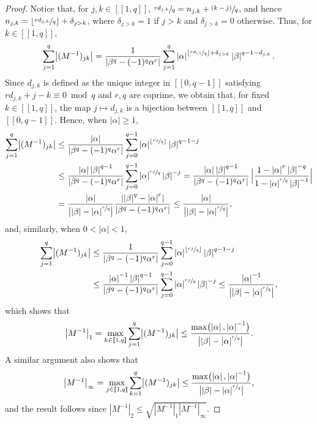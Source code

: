 \documentclass[10pt]{article}
\newcommand{\psfrac}[2]{\sfrac{(#1)}{#2}}
\newcommand{\llbracket}{[\![}
\newcommand{\rrbracket}{]\!]}
\theoremstyle{plain}
\theoremstyle{definition}
\newcommand{\abs}[1]{\left\lvert #1\right \rvert}
\newcommand{\floor}[1]{\left\lfloor #1 \right\rfloor}
\newcommand{\babs}[1]{\bigl\lvert #1\bigr \rvert}
\newcommand{\Babs}[1]{\Bigl\lvert #1\Bigr \rvert}
\numberwithin{equation}{section}\numberwithin{figure}{section}\emergencystretch=3em
\begin{document}
\begin{proof}
Notice that, for $j, k \in \llbracket 1, q\rrbracket$, $\sfrac{r d_{j, k}}{q} = n_{j, k} + \psfrac{k-j}{q}$, and hence $n_{j, k} = \floor{\sfrac{r d_{j, k}}{q}} + \delta_{j > k}$, where $\delta_{j > k} = 1$ if $j > k$ and $\delta_{j > k} = 0$ otherwise. Thus, for $k \in \llbracket 1, q\rrbracket$,\vspace*{-3pt}
\[
\sum_{j=1}^q \babs{(M^{-1})_{jk}} = \frac{1}{\abs{\beta^q - (-1)^q \alpha^r}} \sum_{j=1}^q \abs{\alpha}^{\floor{\sfrac{r d_{j, k}}{q}} + \delta_{j > k}} \abs{\beta}^{q-1-d_{j, k}}.
\]
Since $d_{j, k}$ is defined as the unique integer in $\llbracket 0, q-1\rrbracket$ satisfying $r d_{j, k} + j - k \equiv 0 \bmod q$ and $r, q$ are coprime, we obtain that, for fixed $k \in \llbracket 1, q\rrbracket$, the map $j \mapsto d_{j, k}$ is a bijection between $\llbracket 1, q\rrbracket$ and $\llbracket 0, q-1\rrbracket$. Hence, when $\abs{\alpha} \geq 1$,\vspace*{-3pt}
\begin{align*}
\sum_{j=1}^q \babs{(M^{-1})_{jk}} & \leq \frac{\abs{\alpha}}{\abs{\beta^q - (-1)^q \alpha^r}} \sum_{j=0}^{q-1} \abs{\alpha}^{\floor{\sfrac{r j}{q}}} \abs{\beta}^{q-1-j}\\
&\leq \frac{\abs{\alpha} \abs{\beta}^{q-1}}{\abs{\beta^q - (-1)^q \alpha^r}} \sum_{j=0}^{q-1} \abs{\alpha}^{\sfrac{r j}{q}} \abs{\beta}^{-j} = \frac{\abs{\alpha} \abs{\beta}^{q-1}}{\abs{\beta^q - (-1)^q \alpha^r}}\, \Babs{\frac{1 - \abs{\alpha}^r \abs{\beta}^{-q}}{1 - \abs{\alpha}^{\sfrac{r}{q}} \abs{\beta}^{-1}}}\\
&= \frac{\abs{\alpha}}{\babs{\abs{\beta} - \abs{\alpha}^{\sfrac{r}{q}}}} \frac{\abs{\abs{\beta}^q - \abs{\alpha}^r}}{\abs{\beta^q - (-1)^q \alpha^r}} \leq \frac{\abs{\alpha}}{\babs{\abs{\beta} - \abs{\alpha}^{\sfrac{r}{q}}}},
\end{align*}
and, similarly, when $0 < \abs{\alpha} < 1$,
\begin{align*}
\sum_{j=1}^q \babs{(M^{-1})_{jk}} & \leq \frac{1}{\abs{\beta^q - (-1)^q \alpha^r}} \sum_{j=0}^{q-1} \abs{\alpha}^{\floor{\sfrac{r j}{q}}} \abs{\beta}^{q-1-j}\\
&\leq \frac{\abs{\alpha}^{-1} \abs{\beta}^{q-1}}{\abs{\beta^q - (-1)^q \alpha^r}} \sum_{j=0}^{q-1} \abs{\alpha}^{\sfrac{r j}{q}} \abs{\beta}^{-j}  \leq \frac{\abs{\alpha}^{-1}}{\babs{\abs{\beta} - \abs{\alpha}^{\sfrac{r}{q}}}},
\end{align*}
which shows that
\[
\babs{M^{-1}}_{1} = \max_{k \in \llbracket 1, q\rrbracket} \sum_{j=1}^q \babs{(M^{-1})_{jk}} \leq \frac{\max\bigl(\abs{\alpha}, \abs{\alpha}^{-1}\bigr)}{\babs{\abs{\beta} - \abs{\alpha}^{\sfrac{r}{q}}}}.
\]
A similar argument also shows that
\[
\babs{M^{-1}}_{\infty} = \max_{j \in \llbracket 1, q\rrbracket} \sum_{k=1}^q \babs{(M^{-1})_{jk}} \leq \frac{\max\bigl(\abs{\alpha}, \abs{\alpha}^{-1}\bigr)}{\babs{\abs{\beta} - \abs{\alpha}^{\sfrac{r}{q}}}},
\]
and the result follows since $\abs{M^{-1}}_{2} \leq \sqrt{\abs{M^{-1}}_{1} \abs{M^{-1}}_{\infty}}$.
\end{proof}
\end{document}

